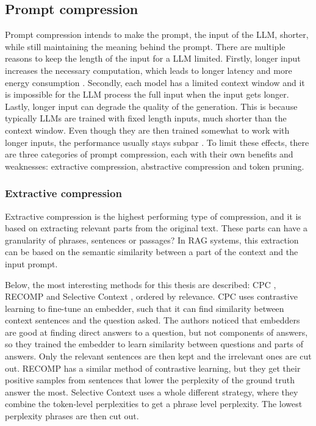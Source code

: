 \subsection{Prompt compression}
Prompt compression intends to make the prompt, the input of the LLM, shorter, while still maintaining the meaning behind the prompt. There are multiple reasons to keep the length of the input for a LLM limited. Firstly, longer input increases the necessary computation, which leads to longer latency and more energy consumption \cite{kim2023arithmeticintensityllm}. Secondly, each model has a limited context window and it is impossible for the LLM process the full input when the input gets longer. Lastly, longer input can degrade the quality of the generation. This is because typically LLMs are trained with fixed length inputs, much shorter than the context window. Even though they are then trained somewhat to work with longer inputs, the performance usually stays subpar \cite{levy2024sameinputlength, liu2024lost}. To limit these effects, there are three categories of prompt compression, each with their own benefits and weaknesses: extractive compression, abstractive compression and token pruning.

\subsubsection{Extractive compression}
Extractive compression is the highest performing type of compression, and it is based on extracting relevant parts from the original text. These parts can have a granularity of phrases, sentences or passages? In RAG systems, this extraction can be based on the semantic similarity between a part of the context and the input prompt. 

Below, the most interesting methods for this thesis are described: CPC \cite{liskavets2025cpc}, RECOMP \cite{xu2023recomp} and Selective Context \cite{li2023selectivecontext}, ordered by relevance. CPC uses contrastive learning to fine-tune an embedder, such that it can find similarity between context sentences and the question asked. The authors noticed that embedders are good at finding direct answers to a question, but not components of answers, so they trained the embedder to learn similarity between questions and parts of answers. Only the relevant sentences are then kept and the irrelevant ones are cut out. RECOMP has a similar method of contrastive learning, but they get their positive samples from sentences that lower the perplexity of the ground truth answer the most. Selective Context uses a whole different strategy, where they combine the token-level perplexities to get a phrase level perplexity. The lowest perplexity phrases are then cut out.

